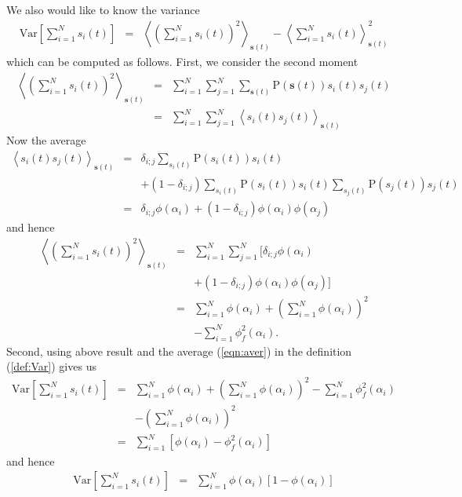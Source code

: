 \documentclass[10pt]{iopart}
\newcommand{\1}{\mathbf{1}}
\newcommand{\Prob}{\mathrm{P}}
\newcommand{\sv}{\ensuremath{\mathbf{s}}}
\begin{document}
We also would like to know the variance 
%
\begin{eqnarray}
%
\mathrm{Var}\left[\sum_{i=1}^N s_i(t)\right]&=&\left\langle\left(\sum_{i=1}^N s_i(t)\right)^2\right\rangle_{\sv(t)} -\left\langle\sum_{i=1}^N s_i(t)\right\rangle_{\sv(t)}^2 \label{def:Var}
%
\end{eqnarray}
%
which  can be computed as follows. First, we consider the second moment  
%
\begin{eqnarray}
%
\left\langle\left(\sum_{i=1}^N s_i(t)\right)^2\right\rangle_{\sv(t)}&=&\sum_{i=1}^N\sum_{j=1}^N \sum_{\sv(t)} \Prob(\sv(t))s_i(t)s_j(t)  \nonumber\\
&=&\sum_{i=1}^N\sum_{j=1}^N \left\langle s_i(t)s_j(t)\right\rangle_{\sv(t)}
%
\end{eqnarray}
%
Now the average 
%
\begin{eqnarray}
%
\left\langle s_i(t)s_j(t)\right\rangle_{\sv(t)}&=&\delta_{i;j} \sum_{s_i(t)} \Prob(s_i(t))s_i(t)\nonumber \\
&& +(1-\delta_{i;j})\sum_{s_i(t)} \Prob(s_i(t))s_i(t)\sum_{s_j(t)} \Prob(s_j(t))s_j(t)\nonumber\\
&=&\delta_{i;j} \phi(\alpha_i) +(1-\delta_{i;j})\phi(\alpha_i)\phi(\alpha_j)
%
\end{eqnarray}
%
and hence 
%
\begin{eqnarray}
%
\left\langle\left(\sum_{i=1}^N s_i(t)\right)^2\right\rangle_{\sv(t)}&=&\sum_{i=1}^N\sum_{j=1}^N \Big[\delta_{i;j} \phi(\alpha_i)\nonumber\\
&&+(1-\delta_{i;j})\phi(\alpha_i)\phi(\alpha_j) \Big] \nonumber\\
&=&\sum_{i=1}^N\phi(\alpha_i)+\left(\sum_{i=1}^N \phi(\alpha_i)\right)^2\nonumber\\
&& -\sum_{i=1}^N\phi^2_f(\alpha_i).
%
\end{eqnarray}
%
Second, using above result  and the average  (\ref{eqn:aver}) in the definition  (\ref{def:Var}) gives us 
%
\begin{eqnarray}
%
\mathrm{Var}\left[\sum_{i=1}^N s_i(t)\right]
&=&\sum_{i=1}^N\phi(\alpha_i)+\left(\sum_{i=1}^N \phi(\alpha_i)\right)^2 -\sum_{i=1}^N\phi^2_f(\alpha_i)\nonumber\\
%
&&-\left(\sum_{i=1}^N \phi(\alpha_i)\right)^2\nonumber\\
%
&=&\sum_{i=1}^N\left[\phi(\alpha_i)-\phi^2_f(\alpha_i)\right]
%
\end{eqnarray}
%
and hence 
%
\begin{eqnarray}
%
\mathrm{Var}\left[\sum_{i=1}^N s_i(t)\right]&=&\sum_{i=1}^N\phi(\alpha_i)\left[1-\phi(\alpha_i)\right]\label{eqn:Var}
%
\end{eqnarray}
%
\end{document}
